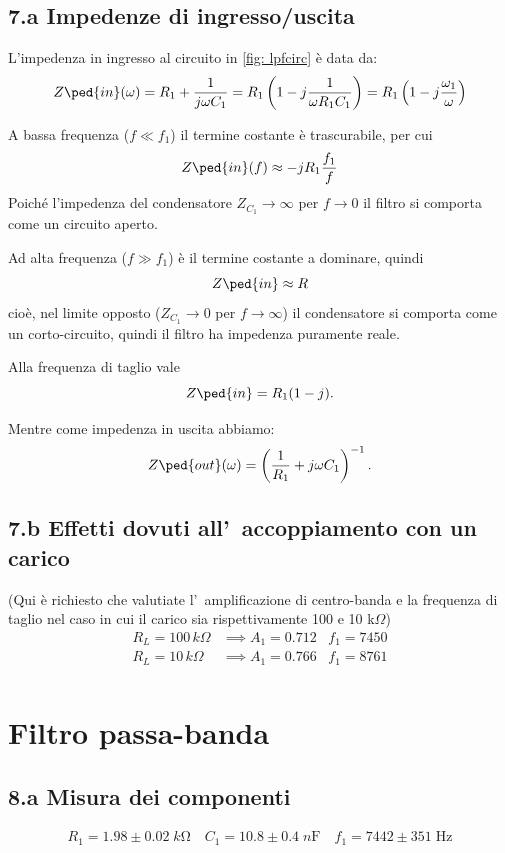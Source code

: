 \documentclass[10pt,a4paper]{article}
\begin{document}
\subsection*{7.a Impedenze di ingresso/uscita}
L'impedenza in ingresso al circuito in \ref{fig: lpfcirc} è data da:
\[
Z\ped{in}(\omega) = R_1 + \frac{1}{j \omega C_1} =
R_1 \left( 1 - j \frac{1}{\omega R_1 C_1} \right) =
R_1 \left( 1 - j \frac{\omega_1}{\omega} \right)
\]

A bassa frequenza ($f \ll f_1$) il termine costante è trascurabile, per cui
\[
Z\ped{in}(f) \approx -jR_1 \frac{f_1}{f}
\]
Poiché l'impedenza del condensatore $Z_{C_1} \to \infty$ per $f \to 0$
il filtro si comporta come un circuito aperto.

Ad alta frequenza ($f \gg f_1$) è il termine costante a dominare, quindi
\[
Z\ped{in} \approx R
\]
cioè, nel limite opposto ($Z_{C_1} \to 0$ per $f \to \infty$) il
condensatore si comporta come un corto-circuito, quindi il filtro ha
impedenza puramente reale.

Alla frequenza di taglio vale
\[
Z\ped{in} = R_1 (1 - j)
.\]

Mentre come impedenza in uscita abbiamo:
\[
Z\ped{out}(\omega) = \left(\frac{1}{R_1} + j\omega C_1\right)^{-1}
.\]

\subsection*{7.b Effetti dovuti all'~accoppiamento con un carico}
(Qui \`e richiesto che valutiate l'~amplificazione di centro-banda e la 
frequenza di taglio nel 
caso in cui il carico sia rispettivamente 100 e 10 k$\Omega$)
\[
\begin{array}{rl}
R_L=100 \,k\Omega & \implies A_1 = 0.712 \;\;\; f_1 = 7450 \\
R_L=10 \,k\Omega & \implies A_1 = 0.766\;\;\; f_1 = 8761 \\
\end{array}
\]

\section*{Filtro passa-banda}

\subsection*{8.a Misura dei componenti}
\begin{align*}
R_1 = 1.98 \pm 0.02 \; \si{k\ohm} \quad C_1 = 10.8 \pm 0.4 \; \si{n\F} \quad
f_1 = 7442 \pm 351 \; \si{\Hz}
\end{align*}
\end{document}
